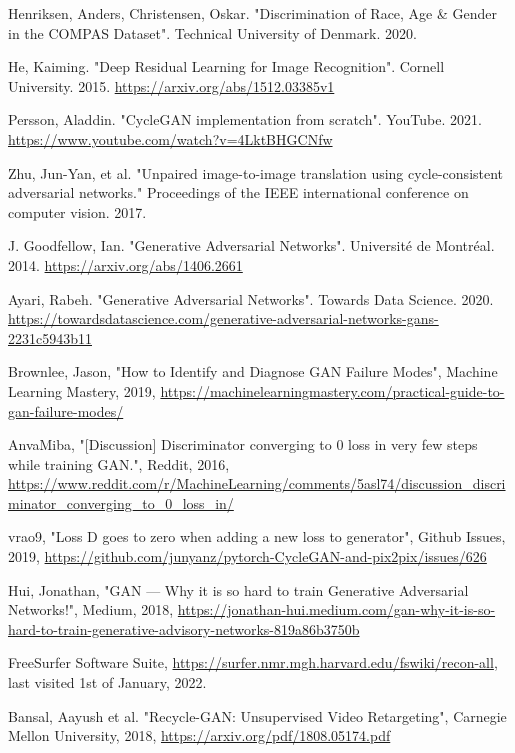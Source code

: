 \documentclass[12pt, fleqn, titlepage]{article}
\newcommand{\1}[1]{\mathds{1}\left[#1\right]}
\begin{document}
\begin{thebibliography}{9}
		 Henriksen, Anders, Christensen, Oskar. "Discrimination of Race, Age \& Gender in the COMPAS Dataset". Technical University of Denmark. 2020.
		
		 He, Kaiming. "Deep Residual Learning for Image Recognition". Cornell University. 2015. \url{https://arxiv.org/abs/1512.03385v1}
	
		 Persson, Aladdin. "CycleGAN implementation from scratch". YouTube. 2021.  \url{https://www.youtube.com/watch?v=4LktBHGCNfw}
	
		 Zhu, Jun-Yan, et al. "Unpaired image-to-image translation using cycle-consistent adversarial networks." Proceedings of the IEEE international conference on computer vision. 2017.
		
		 J. Goodfellow, Ian. "Generative Adversarial Networks". Université de Montréal. 2014. \url{https://arxiv.org/abs/1406.2661}
		
		 Ayari, Rabeh. "Generative Adversarial Networks". Towards Data Science. 2020. \url{https://towardsdatascience.com/generative-adversarial-networks-gans-2231c5943b11}
		
		 Brownlee, Jason, "How to Identify and Diagnose GAN Failure Modes", Machine Learning Mastery, 2019, \url{https://machinelearningmastery.com/practical-guide-to-gan-failure-modes/}
		
		 AnvaMiba, "[Discussion] Discriminator converging to 0 loss in very few steps while training GAN.", Reddit, 2016, \url{https://www.reddit.com/r/MachineLearning/comments/5asl74/discussion\_discriminator\_converging\_to\_0\_loss\_in/}
		
		 vrao9, "Loss D goes to zero when adding a new loss to generator", Github Issues, 2019, \url{https://github.com/junyanz/pytorch-CycleGAN-and-pix2pix/issues/626}
		
		 Hui, Jonathan, "GAN — Why it is so hard to train Generative Adversarial Networks!", Medium, 2018, \url{https://jonathan-hui.medium.com/gan-why-it-is-so-hard-to-train-generative-advisory-networks-819a86b3750b}
		
		 FreeSurfer Software Suite, \url{https://surfer.nmr.mgh.harvard.edu/fswiki/recon-all}, last visited 1st of January, 2022.

		 Bansal, Aayush et al. "Recycle-GAN: Unsupervised Video Retargeting", Carnegie Mellon University, 2018, \url{https://arxiv.org/pdf/1808.05174.pdf}
		

\end{thebibliography}
\end{document}
